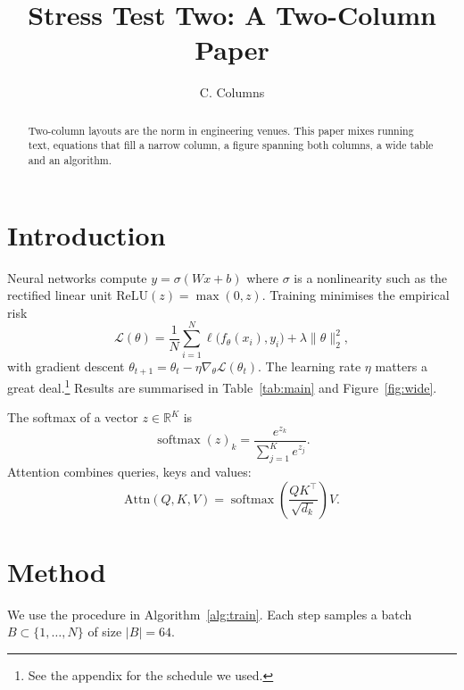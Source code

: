 \documentclass[10pt,twocolumn]{article}
\title{Stress Test Two: A Two-Column Paper}
\author{C. Columns}
\date{}
\begin{document}
\maketitle
\begin{abstract}
Two-column layouts are the norm in engineering venues. This paper mixes running text, equations that
fill a narrow column, a figure spanning both columns, a wide table and an algorithm.
\end{abstract}

\section{Introduction}
Neural networks compute $y = \sigma(Wx + b)$ where $\sigma$ is a nonlinearity such as the rectified
linear unit $\mathrm{ReLU}(z) = \max(0, z)$. Training minimises the empirical risk
\begin{equation}
  \mathcal{L}(\theta) = \frac{1}{N}\sum_{i=1}^{N} \ell\big(f_\theta(x_i), y_i\big) + \lambda \|\theta\|_2^2 ,
  \label{eq:risk}
\end{equation}
with gradient descent $\theta_{t+1} = \theta_t - \eta \nabla_\theta \mathcal{L}(\theta_t)$.
The learning rate $\eta$ matters a great deal.\footnote{See the appendix for the schedule we used.}
Results are summarised in Table~\ref{tab:main} and Figure~\ref{fig:wide}.

The softmax of a vector $z \in \mathbb{R}^K$ is
\begin{equation}
  \operatorname{softmax}(z)_k = \frac{e^{z_k}}{\sum_{j=1}^{K} e^{z_j}} .
\end{equation}
Attention combines queries, keys and values:
\begin{equation}
  \mathrm{Attn}(Q,K,V) = \operatorname{softmax}\!\left(\frac{QK^\top}{\sqrt{d_k}}\right) V .
\end{equation}

\section{Method}
We use the procedure in Algorithm~\ref{alg:train}. Each step samples a batch $B \subset \{1,\dots,N\}$ of size $|B| = 64$.

\begin{algorithm}[t]
\caption{Training loop}\label{alg:train}
\KwOut{$\theta$}
\end{algorithm}
\end{document}
